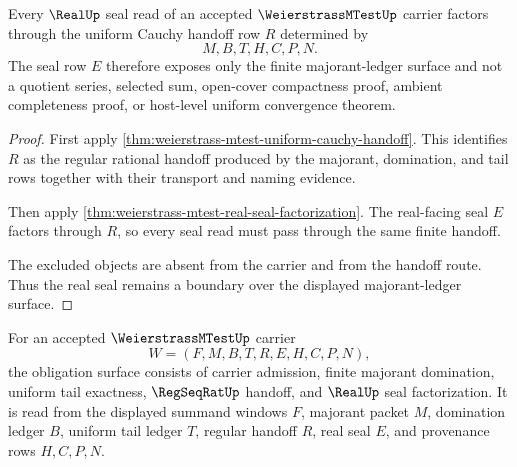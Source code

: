 \begin{theorem}
\label{thm:weierstrass-mtest-real-seal-boundary}
Every $\RealUp$ seal read of an accepted $\WeierstrassMTestUp$ carrier factors through the uniform Cauchy handoff row $R$ determined by
$$
M,B,T,H,C,P,N.
$$
The seal row $E$ therefore exposes only the finite majorant-ledger surface and not a quotient series, selected sum, open-cover compactness proof, ambient completeness proof, or host-level uniform convergence theorem.
\end{theorem}
\begin{proof}
First apply \autoref{thm:weierstrass-mtest-uniform-cauchy-handoff}. This identifies $R$ as the regular rational handoff produced by the majorant, domination, and tail rows together with their transport and naming evidence.

Then apply \autoref{thm:weierstrass-mtest-real-seal-factorization}. The real-facing seal $E$ factors through $R$, so every seal read must pass through the same finite handoff.

The excluded objects are absent from the carrier and from the handoff route. Thus the real seal remains a boundary over the displayed majorant-ledger surface.
\end{proof}

\begin{definition}
\label{def:weierstrass-mtest-obligation-surface}
For an accepted $\WeierstrassMTestUp$ carrier
$$
W=(F,M,B,T,R,E,H,C,P,N),
$$
the obligation surface consists of carrier admission, finite majorant domination, uniform tail exactness, $\RegSeqRatUp$ handoff, and $\RealUp$ seal factorization. It is read from the displayed summand windows $F$, majorant packet $M$, domination ledger $B$, uniform tail ledger $T$, regular handoff $R$, real seal $E$, and provenance rows $H,C,P,N$.
\end{definition}

